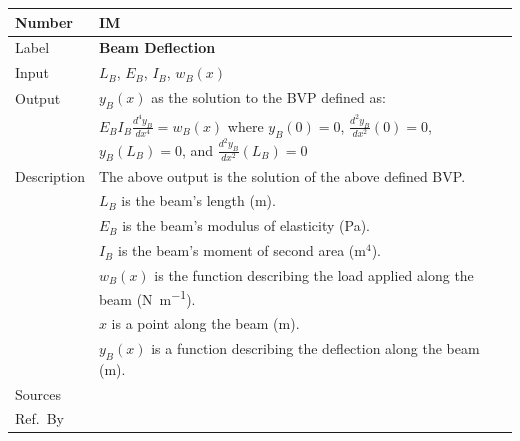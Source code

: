 \documentclass[12pt]{article}
\newcommand{\colAwidth}{0.13\textwidth}
\newcommand{\colBwidth}{0.82\textwidth}
\newcounter{instnum} %
\begin{document}
\noindent
\begin{minipage}{\textwidth}
    \renewcommand*{\arraystretch}{1.5}
    \begin{tabular}{| p{\colAwidth} | p{\colBwidth}|}
        \hline
        \rowcolor[gray]{0.9}
        Number      & IM{instnum}\theinstnum{}\label{im_deflection}                                    \\ \hline
        Label       & \bf Beam Deflection                                                                             \\ \hline
        Input       & $L_B$, $E_B$, $I_B$, $w_{B}(x)$                                                                 \\ \hline
        Output      & \(y_{B}(x)\) as the solution to the BVP defined as:                                             \\
                    & \(E_{B}I_{B}\frac{d^{4}y_{B}}{dx^{4}}=w_{B}(x)\) where \(y_{B}(0)=0\),
        \(\frac{d^{2}y_{B}}{dx^{2}}(0)=0\), \(y_{B}(L_B)=0\), and
        \(\frac{d^{2}y_{B}}{dx^{2}}(L_B)=0\)                                                                          \\ \hline
        Description & The above output is the solution of the above defined BVP.                                      \\
                    & $L_B$ is the beam's length (\si{\metre}).                                                       \\
                    & $E_B$ is the beam's modulus of elasticity (\si{\pascal}).                                       \\
                    & $I_B$ is the beam's moment of second area (\(\si{\metre{}}^{4}\)).                              \\
                    & $w_{B}(x)$ is the function describing the load applied along the beam (\si{\newton\per\metre}). \\
                    & $x$ is a point along the beam (\si{\metre}).                                                    \\
                    & $y_{B}(x)$ is a function describing the deflection along the beam (\si{\metre}).                \\ \hline
        Sources     & \textemdash{}                                                                                   \\ \hline
        Ref.\ By    & \textemdash{}                                                                                   \\ \hline
    \end{tabular}
\end{minipage}\\
\end{document}
